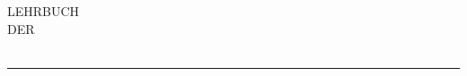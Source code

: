 \begin{center}
\vspace*{5cm}
{\Large LEHRBUCH}\\[1cm]
{\small DER}\\[1.2cm]
{\Huge {}}\\[1.5cm]
\rule{3cm}{0.4pt}
\end{center}
